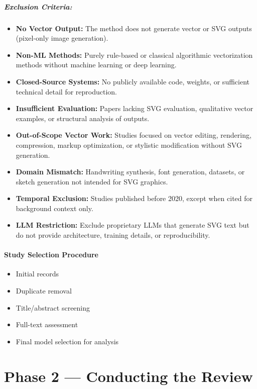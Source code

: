 \subparagraph{Exclusion Criteria:}
\begin{itemize}
    \item \textbf{No Vector Output:} The method does not generate vector or SVG outputs (pixel-only image generation).
    \item \textbf{Non-ML Methods:} Purely rule-based or classical algorithmic vectorization methods without machine learning or deep learning.
    \item \textbf{Closed-Source Systems:} No publicly available code, weights, or sufficient technical detail for reproduction.
    \item \textbf{Insufficient Evaluation:} Papers lacking SVG evaluation, qualitative vector examples, or structural analysis of outputs.
    \item \textbf{Out-of-Scope Vector Work:} Studies focused on vector editing, rendering, compression, markup optimization, or stylistic modification without SVG generation.
    \item \textbf{Domain Mismatch:} Handwriting synthesis, font generation, datasets, or sketch generation not intended for SVG graphics.
    \item \textbf{Temporal Exclusion:} Studies published before 2020, except when cited for background context only.
    \item \textbf{LLM Restriction:} Exclude proprietary LLMs that generate SVG text but do not provide architecture, training details, or reproducibility.
\end{itemize}

\paragraph{Study Selection Procedure}

\begin{itemize}
    \item Initial records
    \item Duplicate removal
    \item Title/abstract screening
    \item Full-text assessment
    \item Final model selection for analysis
\end{itemize}



\section{Phase 2 --- Conducting the Review}

